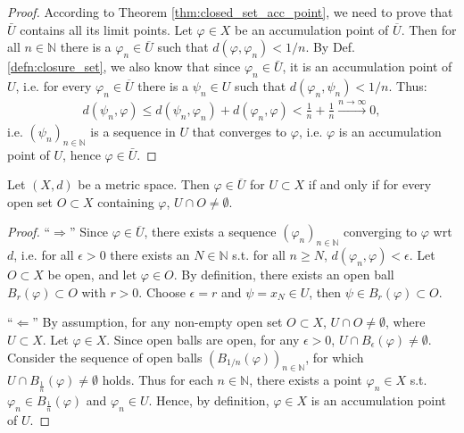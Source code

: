 \begin{proof}
	According to Theorem \ref{thm:closed_set_acc_point}, we need to prove that $\bar{U}$ contains all its limit points. Let $\varphi\in X$ be an accumulation point of $\overline{U}$. Then for all $n\in \mathbb N$ there is a $\varphi_n\in\overline{U}$ such that $d(\varphi, \varphi_n) < 1/n$. By Def. \ref{defn:closure_set}, we also know that since $\varphi_n\in \bar{U}$, it is an accumulation point of $U$, i.e. for every $\varphi_n\in \overline{U}$ there is a $\psi_n\in U$ such that $d(\varphi_n, \psi_n) < 1/n$. Thus:
	\begin{align}
		d(\psi_n, \varphi) \leq d(\psi_n, \varphi_n) + d(\varphi_n, \varphi) < \frac{1}{n} + \frac{1}{n} \overset{n\to\infty}{\longrightarrow} 0,
	\end{align}
	i.e. $(\psi_n)_{n\in\mathbb N}$ is a sequence in $U$ that converges to $\varphi$, i.e. $\varphi$ is an accumulation point of $U$, hence $\varphi\in \bar{U}$.
\end{proof}

\begin{theorem}\label{thrm:property_metric_space}
	Let $(X, d)$ be a metric space. Then $\varphi\in \overline{U}$ for $U\subset X$ if and only if for every open set $O\subset X$ containing $\varphi$, $U\cap O\ne \emptyset$.
\end{theorem}

\begin{proof}
	\enquote{$\Longrightarrow$} Since $\varphi\in\overline{U}$, there exists a sequence $\left(\varphi_n\right)_{n\in\mathbb N}$ converging to $\varphi$ wrt $d$, i.e. for all $\epsilon > 0$ there exists an $N\in\mathbb N$ s.t. for all $n\geq N$, $d(\varphi_n, \varphi) < \epsilon$. Let $O\subset X$ be open, and let $\varphi\in O$. By definition, there exists an open ball $B_{r}(\varphi)\subset O$ with $r > 0$. Choose $\epsilon = r$ and $\psi = x_{N}\in U$, then $\psi\in B_{r}(\varphi) \subset O$.
	
	\enquote{$\Longleftarrow$} By assumption, for any non-empty open set $O\subset X$, $U\cap O\ne\emptyset$, where $U\subset X$. Let $\varphi\in X$. Since open balls are open, for any $\epsilon > 0$, $U\cap B_{\epsilon}(\varphi)\ne\emptyset$. Consider the sequence of open balls $\left( B_{1/n}(\varphi)\right)_{n\in\mathbb N}$, for which $U\cap B_{\frac{1}{n}}(\varphi) \ne \emptyset$ holds. Thus for each $n\in\mathbb N$, there exists a point $\varphi_{n}\in X$ s.t. $\varphi_n \in B_{\frac{1}{n}}(\varphi)$ and $\varphi_n\in U$. Hence, by definition, $\varphi\in X$ is an accumulation point of $U$.
\end{proof}

